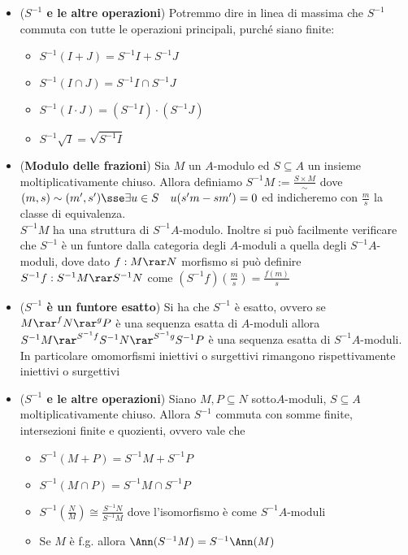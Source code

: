 \documentclass[a4paper,NoNotes,GeneralMath]{stdmdoc}
\begin{document}
\begin{itemize}
\begin{itemize}
			\end{itemize}
		\item ({\bf $S^{-1}$ e le altre operazioni}) Potremmo dire in linea di massima che $S^{-1}$ commuta con tutte le operazioni principali, purché siano finite:
			\begin{itemize}
				\item $S^{-1}(I + J) = S^{-1}I + S^{-1}J$
				\item $S^{-1}(I \cap J) = S^{-1}I \cap S^{-1}J$
				\item $S^{-1}(I \cdot J) = (S^{-1}I) \cdot (S^{-1}J)$
				\item $S^{-1}\sqrt{I} = \sqrt{S^{-1}I}$
			\end{itemize}
		\item ({\bf Modulo delle frazioni}) Sia $M$ un $A$-modulo ed $S \subseteq A$ un insieme moltiplicativamente chiuso. Allora definiamo $S^{-1}M := \frac{S \times M}{\sim}$ dove $(m, s) \sim (m', s') \sse \exists u \in S \quad u (s'm - sm') = 0$ ed indicheremo con $\frac{m}{s}$ la classe di equivalenza. \\
		$S^{-1}M$ ha una struttura di $S^{-1}A$-modulo. Inoltre si può facilmente verificare che $S^{-1}$ è un funtore dalla categoria degli $A$-moduli a quella degli $S^{-1}A$-moduli, dove dato $f: M \rar N$ morfismo si può definire $S^{-1}f: S^{-1}M \rar S^{-1}N$ come $(S^{-1}f) (\frac{m}{s}) = \frac{f(m)}{s}$
		\item ({\bf $S^{-1}$ è un funtore esatto}) Si ha che $S^{-1}$ è esatto, ovvero se $M \rar^f N \rar^g P$ è una sequenza esatta di $A$-moduli allora $S^{-1}M \rar^{S^{-1}f} S^{-1}N \rar^{S^{-1}g} S^{-1}P$ è una sequenza esatta di $S^{-1}A$-moduli. \\
		In particolare omomorfismi iniettivi o surgettivi rimangono rispettivamente iniettivi o surgettivi
		\item ({\bf $S^{-1}$ e le altre operazioni}) Siano $M, P \subseteq N$ sotto$A$-moduli, $S \subseteq A$ moltiplicativamente chiuso. Allora $S^{-1}$ commuta con somme finite, intersezioni finite e quozienti, ovvero vale che
			\begin{itemize}
				\item $S^{-1}(M + P) = S^{-1}M + S^{-1}P$
				\item $S^{-1}(M \cap P) = S^{-1}M \cap S^{-1}P$
				\item $S^{-1}(\frac{N}{M}) \cong \frac{S^{-1}N}{S^{-1}M}$ dove l'isomorfismo è come $S^{-1}A$-moduli
				\item Se $M$ è f.g. allora $\Ann(S^{-1}M) = S^{-1}\Ann(M)$

\end{itemize}
\end{itemize}
\end{document}

